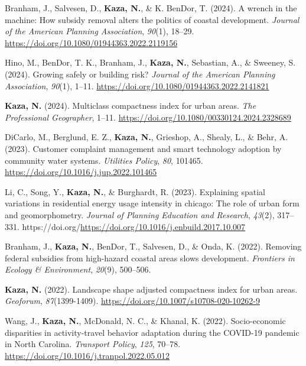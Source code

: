\documentclass[11pt,a4paper,]{awesome-cv}
\newlength{\cslhangindent}
\newenvironment{CSLReferences}[2] %
 {\begin{list}{}{%
  \setlength{\itemindent}{0pt}
  \setlength{\leftmargin}{0pt}
  \setlength{\parsep}{0pt}
  \ifodd #1
   \setlength{\leftmargin}{\cslhangindent}
   \setlength{\itemindent}{-1\cslhangindent}
  \fi
  \setlength{\itemsep}{#2\baselineskip}}}
 {\end{list}}
\begin{document}
\label{refs-57da465f4c744e1dfdf99c9eabaae7cc}
\begin{CSLReferences}{1}{0}
Branham, J., Salvesen, D., \textbf{Kaza, N.}, \& K. BenDor, T. (2024). A
wrench in the machine: How subsidy removal alters the politics of
coastal development. \emph{Journal of the American Planning
Association}, \emph{90}(1), 18--29.
\url{https://doi.org/10.1080/01944363.2022.2119156}

Hino, M., BenDor, T. K., Branham, J., \textbf{Kaza, N.}, Sebastian, A.,
\& Sweeney, S. (2024). Growing safely or building risk? \emph{Journal of
the American Planning Association}, \emph{90}(1), 1--11.
\url{https://doi.org/10.1080/01944363.2022.2141821}

\textbf{Kaza, N.} (2024). Multiclass compactness index for urban areas.
\emph{The Professional Geographer}, 1--11.
\url{https://doi.org/10.1080/00330124.2024.2328689}

DiCarlo, M., Berglund, E. Z., \textbf{Kaza, N.}, Grieshop, A., Shealy,
L., \& Behr, A. (2023). Customer complaint management and smart
technology adoption by community water systems. \emph{Utilities Policy},
\emph{80}, 101465. \url{https://doi.org/10.1016/j.jup.2022.101465}

Li, C., Song, Y., \textbf{Kaza, N.}, \& Burghardt, R. (2023). Explaining
spatial variations in residential energy usage intensity in chicago: The
role of urban form and geomorphometry. \emph{Journal of Planning
Education and Research}, \emph{43}(2), 317--331.
https://doi.org/\url{https://doi.org/10.1016/j.enbuild.2017.10.007}

Branham, J., \textbf{Kaza, N.}, BenDor, T., Salvesen, D., \& Onda, K.
(2022). Removing federal subsidies from high-hazard coastal areas slows
development. \emph{Frontiers in Ecology \& Environment}, \emph{20}(9),
500--506.

\textbf{Kaza, N.} (2022). Landscape shape adjusted compactness index for
urban areas. \emph{Geoforum}, \emph{87}(1399-1409).
\url{https://doi.org/10.1007/s10708-020-10262-9}

Wang, J., \textbf{Kaza, N.}, McDonald, N. C., \& Khanal, K. (2022).
Socio-economic disparities in activity-travel behavior adaptation during
the COVID-19 pandemic in North Carolina. \emph{Transport Policy},
\emph{125}, 70--78. \url{https://doi.org/10.1016/j.tranpol.2022.05.012}


\end{CSLReferences}
\end{document}
